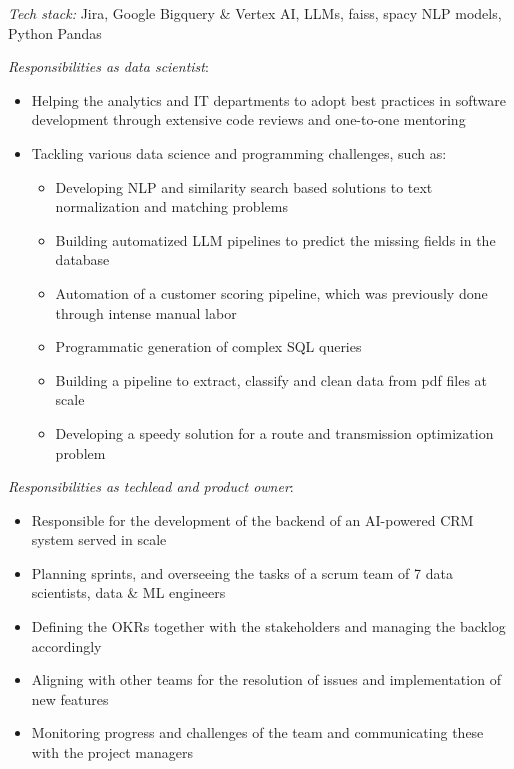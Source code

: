 \documentclass[
	a4paper,
]{fortysecondscv}
\begin{document}
\begin{cvtable}[1.0]
    
	{\href{https://datalogue.com}{\color{pblue}{Datalogue GmbH, Germany}}}
	{
	\textit{Tech stack:} Jira, Google Bigquery \& Vertex AI, LLMs, faiss, spacy NLP models, Python Pandas
	\begin{changemargin}{-45pt}{0pt} 
	\textit{Responsibilities as data scientist}:
    \begin{itemize}[topsep=0pt,itemsep=0pt,partopsep=0pt, parsep=0pt, leftmargin=*]
     \setlength\itemsep{1mm}
     \item Helping the analytics and IT departments to adopt best practices in software development through extensive code reviews and one-to-one mentoring
     \item Tackling various data science and programming challenges, such as:
     \begin{itemize}[topsep=0pt,itemsep=0pt,partopsep=0pt, parsep=0pt, leftmargin=*]
       \item Developing NLP and similarity search based solutions to text normalization and matching problems
       \item Building automatized LLM pipelines to predict the missing fields in the database
       \item Automation of a customer scoring pipeline, which was previously done through intense manual labor
       \item Programmatic generation of complex SQL queries
       \item Building a pipeline to extract, classify and clean data from pdf files at scale
       \item Developing a speedy solution for a route and transmission optimization problem
     \end{itemize}
     \end{itemize}
     \textit{Responsibilities as techlead and product owner}:
     \begin{itemize}[topsep=0pt,itemsep=0pt,partopsep=0pt, parsep=0pt, leftmargin=*]
     \setlength\itemsep{1mm}
     \item Responsible for the development of the backend of an AI-powered CRM system served in scale
     \item Planning sprints, and overseeing the tasks of a scrum team of 7 data scientists, data \& ML engineers
     \item Defining the OKRs together with the stakeholders and managing the backlog accordingly
     \item Aligning with other teams for the resolution of issues and implementation of new features
     \item Monitoring progress and challenges of the team and communicating these with the project managers
    \end{itemize}
    \end{changemargin}
    }
     

\end{cvtable}
\end{document}
